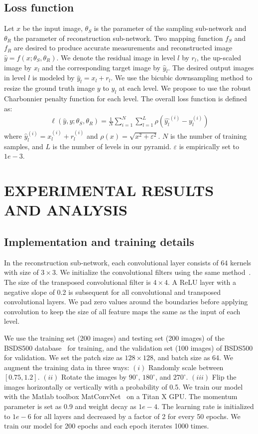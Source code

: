 \documentclass{article}
\begin{document}
\subsection{Loss function}
Let $x$ be the input image, $\theta_{S}$ is the parameter of the sampling sub-network and $\theta_{R}$  the parameter of reconstruction sub-network. Two mapping function $f_{S}$ and $f_{R}$ are desired to produce accurate measurements and reconstructed image $\hat{y}=f(x;\theta_{S},\theta_{R})$. We denote the residual image in level $l$ by $r_{l}$, the up-scaled image by $x_{l}$ and the corresponding target image by $\hat{y}_{l}$. The desired output images in level $l$ is modeled by $\hat{y}_{l}=x_{l}+r_{l}$. We use the bicubic downsampling method to resize the ground truth image $y$ to $y_{l}$ at each level. We propose to use the robust Charbonnier penalty function for each level. The overall loss function is defined as:
\begin{eqnarray}
\label{equ2}
\ell(\hat{y},y;\theta_{S},\theta_{R})=\frac{1}{N}\sum_{i=1}^N\sum_{l=1}^L\rho(\hat{y_{l}}^{(i)}-y_{l}^{(i)})
\end{eqnarray}
where $\hat{y}_{l}^{(i)}=x_{l}^{(i)}+r_{l}^{(i)}$ and $\rho(x)=\sqrt{x^{2}+\varepsilon^{2}}$. $N$ is the number of training samples, and $L$ is the number of levels in our pyramid.  $\varepsilon$ is empirically set to $1e-3$.

\section{EXPERIMENTAL RESULTS AND ANALYSIS}
\subsection{Implementation and training details}
In the reconstruction sub-network, each convolutional layer consists of 64 kernels with size of $3\times3$. We initialize the convolutional filters using the same method~\cite{he2015delving}. The size of the transposed convolutional filter is $4\times4$. A ReLU layer with a negative slope of 0.2 is subsequent for all convolutional and transposed convolutional layers. We pad zero values around the boundaries before applying convolution to keep the size of all feature maps the same as the input of each level.

We use the training set (200 images) and testing set (200 images) of the BSDS500 database~\cite{arbelaez2011contour} for training, and the validation set (100 images) of BSDS500 for validation. We set the patch size as $128\times128$, and batch size as 64. We augment the training data in three ways: $(i)$ Randomly scale between $[0.75, 1.2]$. $(ii)$ Rotate the images by $90^{\circ}$, $180^{\circ}$, and $270^{\circ}$. $(iii)$ Flip the images horizontally or vertically with a probability of 0.5. We train our model with the Matlab toolbox MatConvNet~\cite{vedaldi2015matconvnet} on a Titan X GPU. The momentum parameter is set as 0.9 and weight decay as $1e-4$. The learning rate is initialized to $1e-6$ for all layers and decreased by a factor of 2 for every 50 epochs. We train our model for 200 epochs and each epoch iterates 1000 times.
\end{document}
